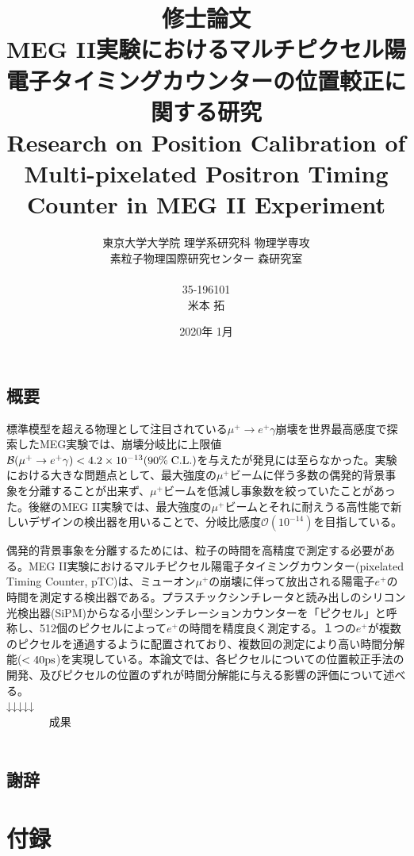\documentclass[report]{jsbook}
\title{
修士論文\\[1.8cm]
{\bf MEG II実験におけるマルチピクセル陽電子タイミングカウンターの位置較正に関する研究} \\
{\LARGE Research on Position Calibration of Multi-pixelated Positron Timing Counter in MEG II Experiment}
\\[0.8cm]}
\author{東京大学大学院 理学系研究科 物理学専攻\\
素粒子物理国際研究センター 森研究室\\ \\
35-196101\\[2.5mm]
\LARGE 米本 拓}
\date{2020年 1月}
\begin{document}

\maketitle
\chapter*{概要}

標準模型を超える物理として注目されている$\mu^+ \to e^+\gamma$崩壊を世界最高感度で探索したMEG実験では、崩壊分岐比に上限値$\mathcal{B} (\mu^+ \to e^+\gamma) < 4.2 \times 10^{-13} (90\% \; {\rm C.L.})$を与えたが発見には至らなかった。実験における大きな問題点として、最大強度の$\mu^+$ビームに伴う多数の偶発的背景事象を分離することが出来ず、$\mu^+$ビームを低減し事象数を絞っていたことがあった。後継のMEG II実験では、最大強度の$\mu^+$ビームとそれに耐えうる高性能で新しいデザインの検出器を用いることで、分岐比感度$\mathcal{O}(10^{-14})$を目指している。 

偶発的背景事象を分離するためには、粒子の時間を高精度で測定する必要がある。MEG II実験におけるマルチピクセル陽電子タイミングカウンター(pixelated Timing Counter, pTC)は、ミューオン$\mu^+$の崩壊に伴って放出される陽電子$e^+$の時間を測定する検出器である。プラスチックシンチレータと読み出しのシリコン光検出器(SiPM)からなる小型シンチレーションカウンターを「ピクセル」と呼称し、512個のピクセルによって$e^+$の時間を精度良く測定する。１つの$e^+$が複数のピクセルを通過するように配置されており、複数回の測定により高い時間分解能($ < 40 \rm ps$)を実現している。本論文では、各ピクセルについての位置較正手法の開発、及びピクセルの位置のずれが時間分解能に与える影響の評価について述べる。 \\

↓↓↓↓↓ \\
~~~~~~~   成果  ~~~~~~~~~\\ \\

\setcounter{tocdepth}{2}
\tableofcontents








\chapter*{謝辞}

\part{付録}
\appendix
\end{document}
